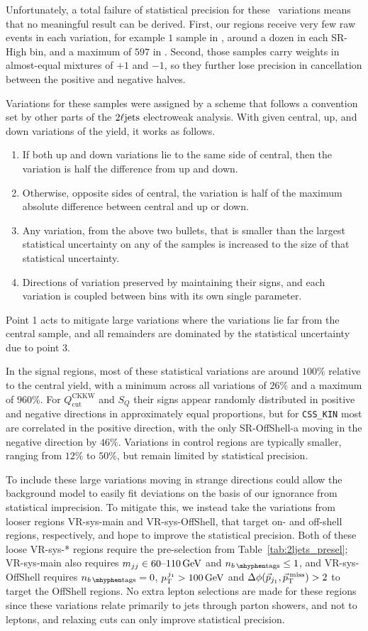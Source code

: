 Unfortunately, a total failure of statistical precision for these \diboson\
variations means that no meaningful result can be derived.
First, our regions receive very few raw events in each variation,
for example $1$ sample in \srllbb, around a dozen in
each SR-High bin, and a maximum of $597$ in \crvz.
Second, those samples carry weights in almost-equal mixtures of $+1$ and $-1$,
so they further lose precision in cancellation between the positive and
negative halves.

Variations for these samples were assigned by a scheme that follows a
convention set by other parts of the $\twoljets$ electroweak analysis.
With given central, up, and down variations of the yield, it works as
follows.
\begin{enumerate}
\item If both up and down variations lie to the same side of central, then
the variation is half the difference from up and down.
\item Otherwise, opposite sides of central, the variation is half of the
maximum absolute difference between central and up or down.
\item Any variation, from the above two bullets, that is smaller than the
largest statistical uncertainty on any of the samples is increased to the size
of that statistical uncertainty.
\item Directions of variation preserved by maintaining their signs, and
each variation is coupled between bins with its own single parameter.
\end{enumerate}
Point 1 acts to mitigate large variations where the variations lie far from
the central sample,
and all remainders are dominated by the statistical uncertainty due to point 3.

In the signal regions, most of these statistical variations are around
$100\%$ relative to the central yield, with a minimum across all variations
of $26\%$ and a maximum of $960\%$.
For $Q_\textrm{cut}^\textrm{CKKW}$ and $S_Q$ their signs appear randomly
distributed in positive and negative directions in approximately equal
proportions, but for \texttt{CSS\_KIN} most are correlated in the positive
direction, with the only SR-OffShell-a moving in the negative direction by
$46\%$.
Variations in control regions are typically smaller, ranging from $12\%$ to
$50\%$, but remain limited by statistical precision.

To include these large variations moving in strange directions could allow the
background model to easily fit deviations on the basis of our ignorance
from statistical imprecision.
To mitigate this, we instead take the variations from looser regions
VR-sys-main and VR-sys-OffShell, that target on- and off-shell regions,
respectively, and hope to improve the statistical precision.
Both of these loose VR-sys-* regions require the pre-selection from
Table~\ref{tab:2ljets_presel};
VR-sys-main also requires
$\mjj \in 60\textrm{--}110\,\eV[G]$ and $\nbtag \leq 1$,
and VR-sys-OffShell requires
$\nbtag = 0$, $\ptjone > 100\,\eV[G]$ and $\dphijmet > 2$ to target the
OffShell regions.
No extra lepton selections are made for these regions since these variations
relate primarily to jets through parton showers, and not to leptons, and
relaxing cuts can only improve statistical precision.

